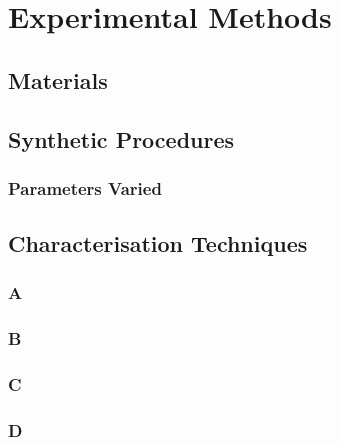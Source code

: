 \chapter{Experimental Methods}
\section{Materials}

\section{Synthetic Procedures}
\subsection{Parameters Varied}

\section{Characterisation Techniques}
\subsection{A}
\subsection{B}
\subsection{C}
\subsection{D}